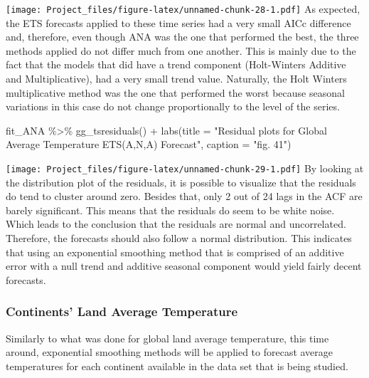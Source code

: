 \documentclass[
]{article}
\newenvironment{Shaded}{\begin{snugshade}}{\end{snugshade}}
\newcommand{\AttributeTok}[1]{\textcolor[rgb]{0.77,0.63,0.00}{#1}}
\newcommand{\FunctionTok}[1]{\textcolor[rgb]{0.00,0.00,0.00}{#1}}
\newcommand{\NormalTok}[1]{#1}
\newcommand{\SpecialCharTok}[1]{\textcolor[rgb]{0.00,0.00,0.00}{#1}}
\newcommand{\StringTok}[1]{\textcolor[rgb]{0.31,0.60,0.02}{#1}}
\begin{document}
\texttt{[image: Project\_files/figure-latex/unnamed-chunk-28-1.pdf]} As
expected, the ETS forecasts applied to these time series had a very
small AICc difference and, therefore, even though ANA was the one that
performed the best, the three methods applied do not differ much from
one another. This is mainly due to the fact that the models that did
have a trend component (Holt-Winters Additive and Multiplicative), had a
very small trend value. Naturally, the Holt Winters multiplicative
method was the one that performed the worst because seasonal variations
in this case do not change proportionally to the level of the series.

\begin{Shaded}
\begin{Highlighting}[]
\NormalTok{fit\_ANA }\SpecialCharTok{\%\textgreater{}\%} 
  \FunctionTok{gg\_tsresiduals}\NormalTok{() }\SpecialCharTok{+} \FunctionTok{labs}\NormalTok{(}\AttributeTok{title =} \StringTok{"Residual plots for Global Average Temperature ETS(A,N,A) Forecast"}\NormalTok{, }\AttributeTok{caption =} \StringTok{"fig. 41"}\NormalTok{)}
\end{Highlighting}
\end{Shaded}

\texttt{[image: Project\_files/figure-latex/unnamed-chunk-29-1.pdf]} By
looking at the distribution plot of the residuals, it is possible to
visualize that the residuals do tend to cluster around zero. Besides
that, only 2 out of 24 lags in the ACF are barely significant. This
means that the residuals do seem to be white noise. Which leads to the
conclusion that the residuals are normal and uncorrelated. Therefore,
the forecasts should also follow a normal distribution. This indicates
that using an exponential smoothing method that is comprised of an
additive error with a null trend and additive seasonal component would
yield fairly decent forecasts.

\hypertarget{continents-land-average-temperature}{%
\subsubsection{Continents' Land Average
Temperature}\label{continents-land-average-temperature}}

Similarly to what was done for global land average temperature, this
time around, exponential smoothing methods will be applied to forecast
average temperatures for each continent available in the data set that
is being studied.
\end{document}
